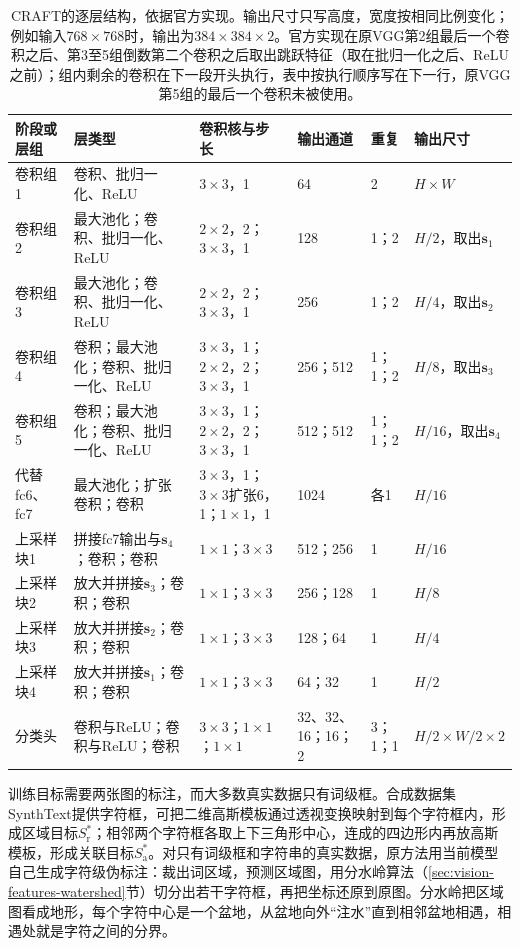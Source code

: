 \begin{table}[tbp]
  \centering
  \small
  \begin{tabularx}{\linewidth}{@{}p{24mm}Xp{24mm}p{14mm}p{10mm}p{22mm}@{}}
    \toprule
    阶段或层组 & 层类型 & 卷积核与步长 & 输出通道 & 重复 & 输出尺寸\\
    \midrule
    卷积组1 & 卷积、批归一化、ReLU & $3\times3$，1 & 64 & 2 & $H\times W$\\
    卷积组2 & 最大池化；卷积、批归一化、ReLU & $2\times2$，2；$3\times3$，1 & 128 & 1；2 & $H/2$，取出$\bm s_1$\\
    卷积组3 & 最大池化；卷积、批归一化、ReLU & $2\times2$，2；$3\times3$，1 & 256 & 1；2 & $H/4$，取出$\bm s_2$\\
    卷积组4 & 卷积；最大池化；卷积、批归一化、ReLU & $3\times3$，1；$2\times2$，2；$3\times3$，1 & 256；512 & 1；1；2 & $H/8$，取出$\bm s_3$\\
    卷积组5 & 卷积；最大池化；卷积、批归一化、ReLU & $3\times3$，1；$2\times2$，2；$3\times3$，1 & 512；512 & 1；1；2 & $H/16$，取出$\bm s_4$\\
    代替fc6、fc7 & 最大池化；扩张卷积；卷积 & $3\times3$，1；$3\times3$扩张6，1；$1\times1$，1 & 1024 & 各1 & $H/16$\\
    上采样块1 & 拼接fc7输出与$\bm s_4$；卷积；卷积 & $1\times1$；$3\times3$ & 512；256 & 1 & $H/16$\\
    上采样块2 & 放大并拼接$\bm s_3$；卷积；卷积 & $1\times1$；$3\times3$ & 256；128 & 1 & $H/8$\\
    上采样块3 & 放大并拼接$\bm s_2$；卷积；卷积 & $1\times1$；$3\times3$ & 128；64 & 1 & $H/4$\\
    上采样块4 & 放大并拼接$\bm s_1$；卷积；卷积 & $1\times1$；$3\times3$ & 64；32 & 1 & $H/2$\\
    分类头 & 卷积与ReLU；卷积与ReLU；卷积 & $3\times3$；$1\times1$；$1\times1$ & 32、32、16；16；2 & 3；1；1 & $H/2\times W/2\times2$\\
    \bottomrule
  \end{tabularx}
  \caption{CRAFT的逐层结构，依据官方实现。输出尺寸只写高度，宽度按相同比例变化；例如输入$768\times768$时，输出为$384\times384\times2$。官方实现在原VGG第2组最后一个卷积之后、第3至5组倒数第二个卷积之后取出跳跃特征（取在批归一化之后、ReLU之前）；组内剩余的卷积在下一段开头执行，表中按执行顺序写在下一行，原VGG第5组的最后一个卷积未被使用。}
  \label{tab:vision-understanding-craft-layers}
\end{table}

训练目标需要两张图的标注，而大多数真实数据只有词级框。合成数据集SynthText提供字符框，可把二维高斯模板通过透视变换映射到每个字符框内，形成区域目标$S_{\mathrm r}^*$；相邻两个字符框各取上下三角形中心，连成的四边形内再放高斯模板，形成关联目标$S_{\mathrm a}^*$。对只有词级框和字符串的真实数据，原方法用当前模型自己生成字符级伪标注：裁出词区域，预测区域图，用分水岭算法（\ref{sec:vision-features-watershed}节）切分出若干字符框，再把坐标还原到原图。分水岭把区域图看成地形，每个字符中心是一个盆地，从盆地向外“注水”直到相邻盆地相遇，相遇处就是字符之间的分界。

